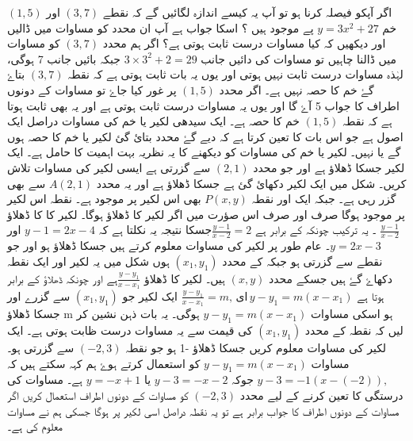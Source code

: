 اگر آپکو فیصلہ کرنا ہو تو آپ یہ کیسے اندازہ لگائیں گے کہ نقطے \( (3,7)   \)  اور  \(    (1,5)   \) خم \( y=3x^2 +27 \) پے موجود ہیں ؟ اسکا جواب ہے آپ ان محدد کو مساوات میں ڈالیں اور دیکھیں کہ کیا مساوات درست ثابت ہوتی ہے؟
اگر ہم محدد \( (3,7)   \)  کو مساوات میں ڈالنا چاہیں تو مساوات کی دائیں جانب \( 3 \times 3^2 +2 = 29 \) جبکہ بائیں جانب 7 ہوگی، لہٰذہ مساوات درست ثابت نہیں ہوتی اور یوں یہ بات ثابت ہوتی ہے کہ نقطہ \( (3,7)   \)  بتاۓ گۓ خم کا حصہ نہیں ہے۔
اگر محدد \(    (1,5)   \)  پر غور کیا جاۓ تو مساوات  کے دونوں اطراف کا جواب 5 آۓ گا اور یوں یہ مساوات درست ثابت ہوتی ہے اور یہ بھی ثابت ہوتا ہے کہ نقطہ \(    (1,5)   \)  خم کا حصہ ہے۔ 
ایک سیدھی لکیر یا خم کی مساوات دراصل ایک اصول ہے جو اس بات کا تعین کرتا ہے کہ دیے گۓ محدد بتائ گئ لکیر یا خم کا حصہ ہوں گے یا نہیں۔
لکیر یا خم کی مساوات کو دیکھنے کا یہ نظریہ بہت اہمیت کا حامل ہے۔
ایک لکیر جسکا ڈھلاؤ   ہے اور جو محدد \(   (2,1)  \) سے گزرتی ہے ایسی لکیر کی مساوات تلاش کریں۔
شکل  میں ایک لکیر دکھائ گئ ہے جسکا ڈھلاؤ   ہے  اور یہ محدد \( A (2,1)  \)  سے بھی گزر رہی ہے۔ جبکہ ایک اور نقطہ \(   P (x,y)\)  بھی اس لکیر پر موجود ہے۔ نقطہ     اس لکیر پر موجود ہوگا صرف اور صرف اس صؤرت میں اگر لکیر     کا  ڈھلاؤ   ہوگا۔ 
لکیر    کا کا ڈھلاؤ  \( \frac{y-1}{x-2} \) ۔ یہ ترکیب چونکہ  کے برابر ہے   \( \frac{y-1}{x-2} =2 \)جسکا نتیجہ یہ نکلتا ہے کہ \( y-1=2x-4 \) اور \(y=2x-3\)۔
عام طور پر لکیر کی مساوات معلوم کرتے ہیں جسکا ڈھلاؤ   ہو اور جو نقطے   سے گزرتی ہو جبکہ  کے محدد  \(   (x_{1},y_{1})  \) ہوں 
شکل  میں یہ لکیر اور ایک نقطہ    دکھاۓ گۓ ہیں جسکے محدد  \(     (x,y)\) ہیں۔ لکیر       کا ڈھلاؤ \( \frac{y-y_1}{x-x_1} \)ہے اور چونکہ ڈھلاؤ  کے برابر ہوتا ہے \( \frac{y-y_1}{x-x_1} =m, \, یا \, y-y_1 = m(x-x_1) \)
 ایک لکیر جو \(   (x_{1},y_{1})  \) سے گزرے اور جسکا ڈھلاؤ m ہو اسکی مساوات \( y-y_1 = m(x-x_1) \) ہوگی۔
یہ بات ذہن نشین کر لیں کہ نقطہ  کے محدد \(   (x_{1},y_{1})  \) کی قیمت سے یہ مساوات درست ظابت ہوتی ہے۔
ایک لکیر کی مساوات معلوم کریں جسکا ڈھلاؤ -1 ہو جو نقطہ \( (-2,3) \) سے گزرتی ہو۔
مساوات \( y-y_1 = m(x-x_1) \) کو استعمال کرتے ہوۓ ہم کہہ سکتے ہیں کہ \( y-3=-1(x-(-2)), \) جوکہ \( y-3=-x-2 \) یا \(y=-x+1\) ہے۔  مساوات کی درستگی کا تعین کرنے کے لیے محدد \( (-2,3) \) کو مساوات کے دونوں اطراف استعمال کریں اگر مساوات کے دونوں اطراف کا جواب برابر ہے تو یہ نقطہ دراصل اسی لکیر پر ہوگا جسکی ہم نے  مساوات معلوم کی ہے۔
